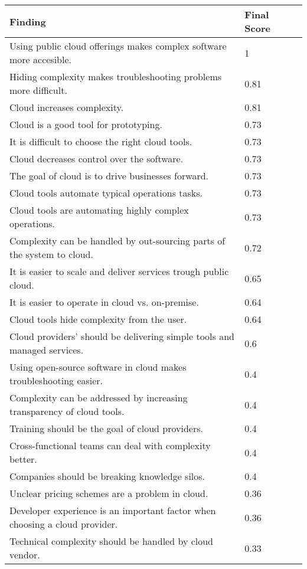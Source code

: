 
\renewcommand\arraystretch{1.5}%
\begin{longtable}{|p{10cm}|p{2cm}|p{2cm}|}
\hline
\textbf{Finding} & \textbf{Final Score} \\ \hline
\endhead
Using public cloud offerings makes complex software more accesible. & 1 \\ \hline
Hiding complexity makes troubleshooting problems more difficult. & 0.81 \\ \hline
Cloud increases complexity. & 0.81 \\ \hline
Cloud is a good tool for prototyping. & 0.73 \\ \hline
It is difficult to choose the right cloud tools. & 0.73 \\ \hline
Cloud decreases control over the software. & 0.73 \\ \hline
The goal of cloud is to drive businesses forward. & 0.73 \\ \hline
Cloud tools automate typical operations tasks. & 0.73 \\ \hline
Cloud tools are automating highly complex operations. & 0.73 \\ \hline
Complexity can be handled by out-sourcing parts of the system to cloud. & 0.72 \\ \hline
It is easier to scale and deliver services trough public cloud. & 0.65 \\ \hline
It is easier to operate in cloud vs. on-premise. & 0.64 \\ \hline
Cloud tools hide complexity from the user. & 0.64 \\ \hline
Cloud providers' should be delivering simple tools and managed services. & 0.6 \\ \hline
Using open-source software in cloud makes troubleshooting easier. & 0.4 \\ \hline
Complexity can be addressed by increasing transparency of cloud tools. & 0.4 \\ \hline
Training should be the goal of cloud providers. & 0.4 \\ \hline
Cross-functional teams can deal with complexity better. & 0.4 \\ \hline
Companies should be breaking knowledge silos. & 0.4 \\ \hline
Unclear pricing schemes are a problem in cloud. & 0.36 \\ \hline
Developer experience is an important factor when choosing a cloud provider. & 0.36 \\ \hline
Technical complexity should be handled by cloud vendor. & 0.33 \\ \hline

\end{longtable}
